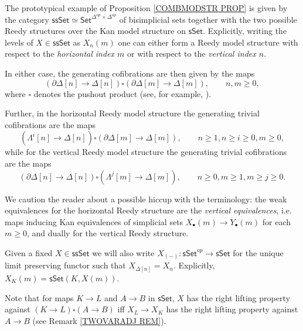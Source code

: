 \documentclass[a4paper,10pt
 ,draft
]{article}%
\begin{document}
The prototypical example of Proposition \ref{COMBMODSTR PROP} is given by the category 
$\mathsf{ssSet} \simeq \mathsf{Set}^{\Delta^{op} \times \Delta^{op}}$
of bisimplicial sets together with the two possible Reedy structures over the Kan model structure on $\mathsf{sSet}$.
Explicitly, writing the levels of 
$X \in \mathsf{ssSet}$ as $X_n(m)$
one can either form a Reedy model structure with respect to the 
\textit{horizontal index $m$}
or with respect to the 
\textit{vertical index $n$}.

In either case, the generating cofibrations are then given by the maps
\[
	\left( \partial \Delta[n] \to \Delta[n] \right)
\square
	\left( \partial \Delta[m] \to \Delta[m] \right),
	\qquad n,m\geq 0,
\]
where $\square$ denotes the pushout product (see, for example, \cite[11.1.7]{Ri14}).

Further, in the horizontal Reedy model structure the generating trivial cofibrations are the maps
\begin{equation}\label{GTRCOHOR EQ}
	\left( \Lambda^i[n] \to \Delta[n] \right)
\square
	\left( \partial \Delta[m] \to \Delta[m] \right),
\qquad n \geq 1, n \geq i \geq 0, m\geq 0, 
\end{equation}
while for the vertical Reedy model structure the generating trivial cofibrations are the maps
\begin{equation}\label{GTRCOVER EQ}
	\left( \partial \Delta[n] \to \Delta[n] \right)
\square
	\left( \Lambda^j[m] \to \Delta[m] \right),
\qquad n\geq 0, m\geq 1,m\geq j \geq 0.
\end{equation}

We caution the reader about a possible hiccup with the terminology: 
the weak equivalences for the horizontal Reedy structure are the 
\textit{vertical equivalences},
i.e. maps inducing Kan equivalences of simplicial sets
$X_{\bullet}(m) \to Y_{\bullet}(m)$
for each $m \geq 0$, and dually for the vertical Reedy structure.

\begin{notation}\label{UNIQUELIM NOT}
	Given a fixed $X \in \mathsf{ssSet}$ we will also write
	$X_{(-)} \colon \mathsf{sSet}^{op} \to \mathsf{sSet}$
	for the unique limit preserving functor such that
	$X_{\Delta[n]} = X_n$.
	Explicitly, $X_K(m) = \mathsf{sSet}(K,X(m))$.
	
        
        Note that for maps $K\to L$ and $A\to B$ in $\mathsf{sSet}$, $X$ has the right lifting property against
        $(K \to L) \square (A\to B)$ iff
        $X_L \to X_K$ has the right lifting property against $A\to B$
        (see Remark \ref{TWOVARADJ REM}).
\end{notation}
\end{document}
